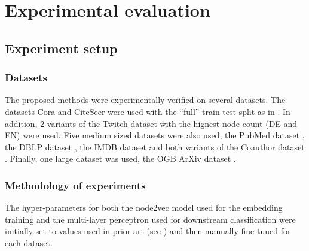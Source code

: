 \section{Experimental evaluation}\label{sec:experimental-evaluation}

\subsection{Experiment setup}

\subsubsection{Datasets}

The proposed methods were experimentally verified on several datasets. The datasets Cora and CiteSeer \cite{yang_revisiting_2016} were used with the \enquote{full} train-test split as in \cite{chen_fastgcn_2018}. In addition, 2 variants of the Twitch dataset \cite{rozemberczki_multi-scale_2021} with the hignest node count (DE and EN) were used. Five medium sized datasets were also used, the PubMed dataset \cite{yang_revisiting_2016}, the DBLP dataset \cite{bojchevski_deep_2018}, the IMDB dataset \cite{xinyu_magnn:_2020} and both variants of the Coauthor dataset \cite{shchur_pitfalls_2019}. Finally, one large dataset was used, the OGB ArXiv dataset \cite{weihua_open_2021}.

\subsubsection{Methodology of experiments}

The hyper-parameters for both the node2vec model used for the embedding training and the multi-layer perceptron used for downstream classification were initially set to values used in prior art (see \cite{hu_open_2021,fey_fast_2019}) and then manually fine-tuned for each dataset.

